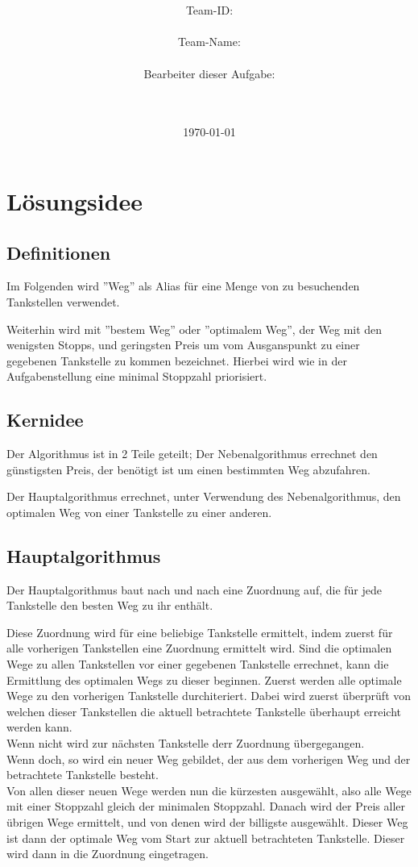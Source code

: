 \documentclass[a4paper,10pt,ngerman]{scrartcl}
\title{\textbf{\Huge\Aufgabe}}
\author{\LARGE Team-ID: \LARGE \TeamID \\\\
	    \LARGE Team-Name: \LARGE \TeamName \\\\
	    \LARGE Bearbeiter dieser Aufgabe: \\ 
	    \LARGE \Namen\\\\}
\date{\LARGE\today}
\begin{document}
\maketitle
\tableofcontents

\vspace{0.5cm}

\section{Lösungsidee}

\subsection{Definitionen}

Im Folgenden wird ''Weg'' als Alias für eine Menge von zu besuchenden Tankstellen verwendet.

Weiterhin wird mit ''bestem Weg'' oder ''optimalem Weg'', der Weg mit den wenigsten Stopps, und geringsten Preis um vom Ausganspunkt zu einer gegebenen Tankstelle zu kommen bezeichnet. Hierbei wird wie in der Aufgabenstellung eine minimal Stoppzahl priorisiert.

\subsection{Kernidee}

Der Algorithmus ist in 2 Teile geteilt;
Der Nebenalgorithmus errechnet den günstigsten Preis, der benötigt ist um einen bestimmten Weg abzufahren.

Der Hauptalgorithmus errechnet, unter Verwendung des Nebenalgorithmus, den optimalen Weg von einer Tankstelle zu einer anderen.

\subsection{Hauptalgorithmus}

Der Hauptalgorithmus baut nach und nach eine Zuordnung auf, die für jede Tankstelle den besten Weg zu ihr enthält.

Diese Zuordnung wird für eine beliebige Tankstelle ermittelt, indem zuerst für alle vorherigen Tankstellen eine Zuordnung ermittelt wird. 
Sind die optimalen Wege zu allen Tankstellen vor einer gegebenen Tankstelle errechnet, kann die Ermittlung des optimalen Wegs zu dieser beginnen.
Zuerst werden alle optimale Wege zu den vorherigen Tankstelle durchiteriert. Dabei wird zuerst überprüft von welchen dieser Tankstellen die aktuell betrachtete Tankstelle überhaupt erreicht werden kann. \\
Wenn nicht wird zur nächsten Tankstelle derr Zuordnung übergegangen. \\
Wenn doch, so wird ein neuer Weg gebildet, der aus dem vorherigen Weg und der betrachtete Tankstelle besteht. \\
Von allen dieser neuen Wege werden nun die kürzesten ausgewählt, also alle Wege mit einer Stoppzahl gleich der minimalen Stoppzahl. Danach wird der Preis aller übrigen Wege ermittelt, und von denen wird der billigste ausgewählt. Dieser Weg ist dann der optimale Weg vom Start zur aktuell betrachteten Tankstelle. Dieser wird dann in die Zuordnung eingetragen.
\end{document}
